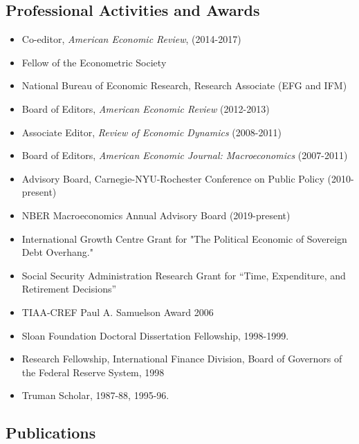 \documentclass[12pt]{article}
\begin{document}
\subsection*{Professional Activities and Awards}

\begin{itemize}[left=0pt .. \parindent, label=]
\item Co-editor, \textit{American Economic Review}, (2014-2017)

\item Fellow of the Econometric Society

\item National Bureau of Economic Research, Research Associate (EFG and IFM)

\item Board of Editors, \textit{American Economic Review} (2012-2013)

\item Associate Editor, \textit{Review of Economic Dynamics} (2008-2011)

\item Board of Editors, \textit{American Economic Journal: Macroeconomics}
(2007-2011)

\item Advisory Board, Carnegie-NYU-Rochester Conference on Public Policy
(2010-present)

\item NBER Macroeconomics Annual Advisory Board (2019-present)

\item International Growth Centre Grant for "The Political Economic of
Sovereign Debt Overhang."

\item Social Security Administration Research Grant for ``Time, Expenditure,
and Retirement Decisions''

\item TIAA-CREF Paul A. Samuelson Award 2006

\item Sloan Foundation Doctoral Dissertation Fellowship, 1998-1999.

\item Research Fellowship, International Finance Division, Board of Governors of the Federal Reserve System, 1998

\item Truman Scholar, 1987-88, 1995-96.

\end{itemize}
 

\subsection*{Publications}
\end{document}
